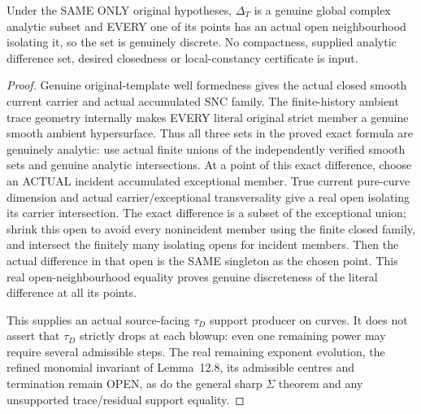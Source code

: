 \begin{theorem}
\label{hir:sharp-original-curve-actual-tauD-analytic-discrete}
\leanok
Under the SAME ONLY original hypotheses, $\Delta_T$ is a genuine global
complex analytic subset and EVERY one of its points has an actual open
neighbourhood isolating it, so the set is genuinely discrete. No compactness, supplied analytic difference set,
desired closedness or local-constancy certificate is input.
\end{theorem}
\begin{proof}
Genuine original-template well formedness gives the actual closed smooth
current carrier and actual accumulated SNC family. The finite-history
ambient trace geometry internally makes EVERY literal original strict
member a genuine smooth ambient hypersurface. Thus all three sets in the
proved exact formula are genuinely analytic: use actual finite unions of
the independently verified smooth sets and genuine analytic intersections.
At a point of this exact difference, choose an ACTUAL incident accumulated
exceptional member. True current pure-curve dimension and actual
carrier/exceptional transversality give a real open isolating its carrier
intersection. The exact difference is a subset of the exceptional union;
shrink this open to avoid every nonincident member using the finite closed
family, and intersect the finitely many isolating opens for incident members.
Then the actual difference in that open is the SAME singleton as the chosen
point. This real open-neighbourhood equality proves genuine discreteness
of the literal difference at all its points.

This supplies an actual source-facing $\tau_D$ support producer on curves.
It does not assert that $\tau_D$ strictly drops at each blowup: even one
remaining power may require several admissible steps. The real remaining
exponent evolution, the refined monomial invariant of Lemma~12.8, its
admissible centres and termination remain OPEN, as do the general sharp
$\Sigma$ theorem and any unsupported trace/residual support equality.
\end{proof}

